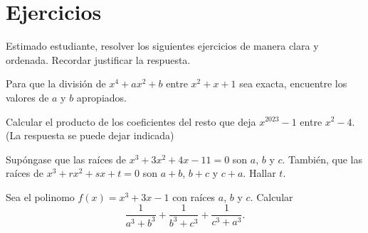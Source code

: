 \section*{\large Ejercicios}

Estimado estudiante, resolver los siguientes ejercicios de manera clara y ordenada. Recordar justificar la respuesta.

\begin{exercise}
    Para que la división de $x^4 + ax^2 + b$ entre $x^2 + x + 1$ sea exacta, encuentre los valores de $a$ y $b$ apropiados.
\end{exercise}

\begin{exercise}
    Calcular el producto de los coeficientes del resto que deja $x^{2023} - 1$ entre $x^2 - 4$. (La respuesta se puede dejar indicada)
\end{exercise}

\begin{exercise}
    Supóngase que las raíces de $x^3 + 3x^2 + 4x - 11 = 0$ son $a$, $b$ y $c$.
    También, que las raíces de $x^3 + rx^2 + sx + t = 0$ son $a + b$, $b + c$ y $c + a$.
    Hallar $t$.
\end{exercise}

\begin{exercise}
    Sea el polinomo $f(x) = x^3 + 3x - 1$ con raíces $a$, $b$ y $c$.
    Calcular
    \[\frac{1}{a^3 + b^3} + \frac{1}{b^3 + c^3} + \frac{1}{c^3 + a^3}.\]
\end{exercise}




